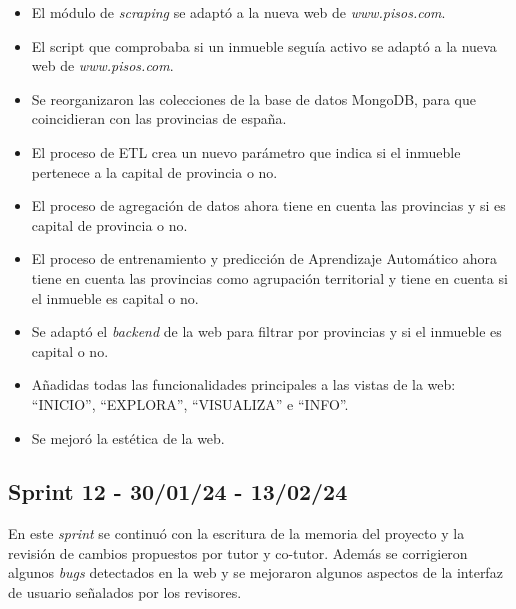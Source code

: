 \begin{itemize}
    \item El módulo de \textit{scraping} se adaptó a la nueva web de \textit{www.pisos.com}.
    \item El script que comprobaba si un inmueble seguía activo se adaptó a la nueva web de \textit{www.pisos.com}.
    \item Se reorganizaron las colecciones de la base de datos MongoDB, para que coincidieran con las provincias de españa.
    \item El proceso de ETL crea un nuevo parámetro que indica si el inmueble pertenece a la capital de provincia o no.
    \item El proceso de agregación de datos ahora tiene en cuenta las provincias y si es capital de provincia o no.
    \item El proceso de entrenamiento y predicción de Aprendizaje Automático ahora tiene en cuenta las provincias como agrupación territorial y tiene en cuenta si el inmueble es capital o no.
    \item Se adaptó el \textit{backend} de la web para filtrar por provincias y si el inmueble es capital o no.
    \item Añadidas todas las funcionalidades principales a las vistas de la web: ``INICIO'', ``EXPLORA'', ``VISUALIZA'' e ``INFO''.
    \item Se mejoró la estética de la web.
\end{itemize}

\subsection{Sprint 12 -  30/01/24 - 13/02/24}

En este \textit{sprint} se continuó con la escritura de la memoria del proyecto y la revisión de cambios propuestos por tutor y co-tutor. Además se corrigieron algunos \textit{bugs} detectados en la web y se mejoraron algunos aspectos de la interfaz de usuario señalados por los revisores.

